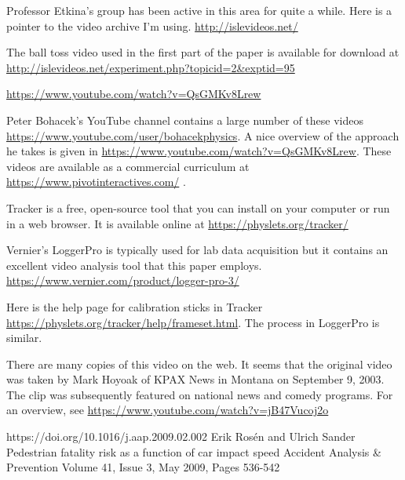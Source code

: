 \documentclass[prb,twocolumn]{revtex4-2}
\begin{document}
\begin{thebibliography}{99}

 Professor Etkina's group has been active in this area for quite a while.  Here is a pointer to the video archive I'm using. \url{http://islevideos.net/}
  
The ball toss video used in the first part of the paper is available for download at \url{http://islevideos.net/experiment.php?topicid=2&exptid=95}

\url{https://www.youtube.com/watch?v=QsGMKv8Lrew}

 Peter Bohacek's YouTube channel contains a large number of these videos \url{https://www.youtube.com/user/bohacekphysics}.  
A nice overview of the approach he takes is given in \url{https://www.youtube.com/watch?v=QsGMKv8Lrew}. 
These videos are available as a commercial curriculum at \url{https://www.pivotinteractives.com/} .

 Tracker is a free, open-source tool that you can install on your computer or run in a web browser.  It is available online at \url{https://physlets.org/tracker/} 

 Vernier's LoggerPro is typically used for lab data acquisition but it contains an excellent video analysis tool that this paper employs. 
\url{https://www.vernier.com/product/logger-pro-3/}

 Here is the help page for calibration sticks in Tracker \url{https://physlets.org/tracker/help/frameset.html}.  The process in LoggerPro is similar.

There are many copies of this video on the web.  It seems that the original video was taken by Mark Hoyoak of KPAX News in Montana on September 9, 2003.  The clip was subsequently featured on national news and comedy programs.  For an overview, see \url{https://www.youtube.com/watch?v=jB47Vucoj2o}
   
https://doi.org/10.1016/j.aap.2009.02.002
Erik Rosén and Ulrich Sander
Pedestrian fatality risk as a function of car impact speed
Accident Analysis \& Prevention
Volume 41, Issue 3, May 2009, Pages 536-542



\end{thebibliography}
\end{document}

